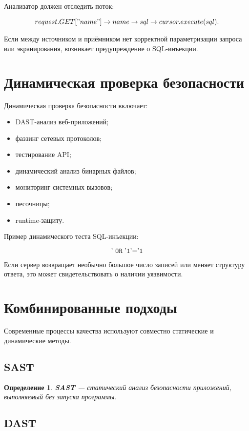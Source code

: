 \documentclass[12pt,a4paper]{article}
\newtheorem{definition}{Определение}
\begin{document}
Анализатор должен отследить поток:

\[
request.GET["name"] \to name \to sql \to cursor.execute(sql).
\]

Если между источником и приёмником нет корректной параметризации запроса или экранирования, возникает предупреждение о SQL-инъекции.

\section{Динамическая проверка безопасности}

Динамическая проверка безопасности включает:

\begin{itemize}
  \item DAST-анализ веб-приложений;
  \item фаззинг сетевых протоколов;
  \item тестирование API;
  \item динамический анализ бинарных файлов;
  \item мониторинг системных вызовов;
  \item песочницы;
  \item runtime-защиту.
\end{itemize}

Пример динамического теста SQL-инъекции:

\[
\texttt{' OR '1'='1}
\]

Если сервер возвращает необычно большое число записей или меняет структуру ответа, это может свидетельствовать о наличии уязвимости.

\section{Комбинированные подходы}

Современные процессы качества используют совместно статические и динамические методы.

\subsection{SAST}

\begin{definition}
\textbf{SAST} --- статический анализ безопасности приложений, выполняемый без запуска программы.
\end{definition}

\subsection{DAST}
\end{document}
